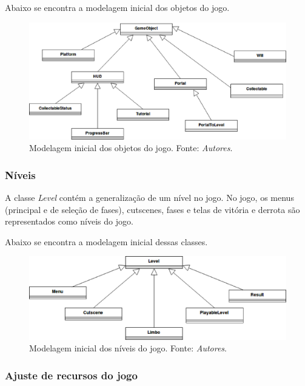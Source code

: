       Abaixo se encontra a modelagem inicial dos objetos do jogo.

      \begin{figure}[H]
        \centering \includegraphics[keepaspectratio=true,scale=0.6]{figuras/class-diagram-1.eps}
        \caption[Modelagem inicial dos objetos do jogo]
          {Modelagem inicial dos objetos do jogo. Fonte: \textit{Autores}.}
        \label{game-object-children}
      \end{figure}

    \subsubsection{Níveis}

      A classe \textit{Level} contém a generalização de um nível no jogo. No jogo, os menus (principal e de seleção de fases), cutscenes, fases e telas de vitória e derrota são representados como níveis do jogo.

      Abaixo se encontra a modelagem inicial dessas classes.

      \begin{figure}[H]
        \centering \includegraphics[keepaspectratio=true,scale=0.6]{figuras/class-diagram-2.eps}
        \caption[Modelagem inicial dos níveis do jogo]
          {Modelagem inicial dos níveis do jogo. Fonte: \textit{Autores}.}
        \label{game-object-levels}
      \end{figure}

    \subsubsection{Ajuste de recursos do jogo}

